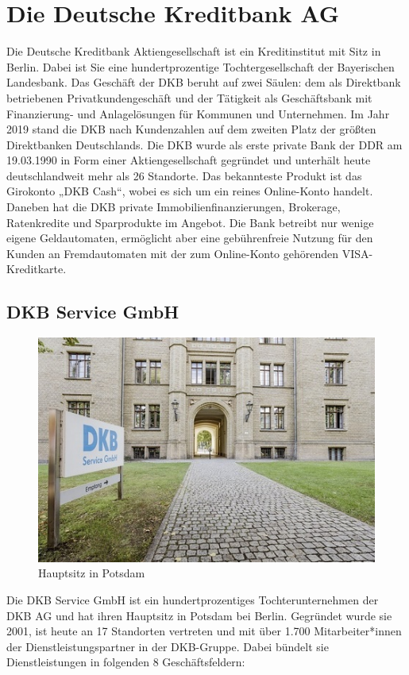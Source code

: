\section{Die Deutsche Kreditbank AG}\label{einleitung}

Die Deutsche Kreditbank Aktiengesellschaft ist ein Kreditinstitut mit Sitz in Berlin. Dabei ist Sie eine hundertprozentige Tochtergesellschaft der Bayerischen Landesbank. Das Geschäft der DKB beruht auf zwei Säulen: dem als Direktbank betriebenen Privatkundengeschäft und der Tätigkeit als Geschäftsbank mit Finanzierung- und Anlagelösungen für Kommunen und Unternehmen. Im Jahr 2019 stand die DKB nach Kundenzahlen auf dem zweiten Platz der größten Direktbanken Deutschlands. 
Die DKB wurde als erste private Bank der DDR am 19.03.1990 in Form einer Aktiengesellschaft gegründet und unterhält heute deutschlandweit mehr als 26 Standorte. Das bekannteste Produkt ist das Girokonto „DKB Cash“, wobei es sich um ein reines Online-Konto handelt. Daneben hat die DKB private Immobilienfinanzierungen, Brokerage, Ratenkredite und Sparprodukte im Angebot. Die Bank betreibt nur wenige eigene Geldautomaten, ermöglicht aber eine gebührenfreie Nutzung für den Kunden an Fremdautomaten mit der zum Online-Konto gehörenden VISA-Kreditkarte.

\subsection{DKB Service GmbH}\label{einleitung}
\begin{figure}[H] 
  \centering
     \includegraphics[width=1\textwidth]{dkb.jpg}
  \caption{Hauptsitz in Potsdam}
  \label{fig:Bild1}
\end{figure}
\noindent
Die DKB Service GmbH ist ein hundertprozentiges Tochterunternehmen der DKB AG und hat ihren Hauptsitz in Potsdam bei Berlin. Gegründet wurde sie 2001, ist heute an 17 Standorten vertreten und mit über 1.700 Mitarbeiter*innen der Dienstleistungspartner in der DKB-Gruppe. Dabei bündelt sie Dienstleistungen in folgenden 8 Geschäftsfeldern:

